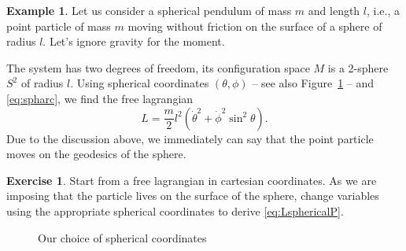 \documentclass[english,fontsize=11pt,paper=b5]{scrbook}
\theoremstyle{definition}
\newtheorem{example}{Example}[chapter]
\newtheorem{exercise}{Exercise}[chapter]
\begin{document}
    \begin{example}\label{ex:sphericalP}
      Let us consider a spherical pendulum of mass $m$ and length $l$, i.e., a point particle of mass $m$ moving without friction on the surface of a sphere of radius $l$.
      Let's ignore gravity for the moment.

      The system has two degrees of freedom, its configuration space $M$ is a 2-sphere $S^2$ of radius $l$.
      Using spherical coordinates $(\theta, \phi)$ -- see also Figure~\ref{fig:sphcoords} -- and \eqref{eq:spharc}, we find the free lagrangian
      \begin{equation}\label{eq:LsphericalP}
        L = \frac m2 l^2(\dot \theta^2 + \dot \phi^2 \sin^2\theta).
      \end{equation}
      Due to the discussion above, we immediately can say that the point particle moves on the geodesics of the sphere.
    \end{example}

    \begin{exercise}
      Start from a free lagrangian in cartesian coordinates.
      As we are imposing that the particle lives on the surface of the sphere, change variables using the appropriate spherical coordinates to derive \eqref{eq:LsphericalP}.
    \end{exercise}

    \begin{figure}[ht]
      \centering
      \caption{Our choice of spherical coordinates}
      \label{fig:sphcoords}
    \end{figure}
\end{document}
